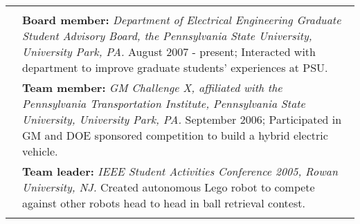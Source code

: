 \documentclass{article}[16pt]
\newlength{\lcolw}
\newlength{\rcolw}
\newlength{\hlcolw}
\begin{document}
\begin{tabular}{L{\hlcolw}  L{\rcolw}}
\vspace{0.1in} \\ 
& \textbf{Board member:} {\it Department of Electrical Engineering Graduate Student Advisory Board, the Pennsylvania State University, University Park, PA.} August 2007 - present; Interacted with department to improve graduate students' experiences at PSU.
\vspace{0.1in} \\ 
& \textbf{Team member:} {\it GM Challenge X, affiliated with the Pennsylvania Transportation Institute, Pennsylvania State University, University Park, PA.} September 2006; Participated in GM and DOE sponsored competition to build a hybrid electric vehicle.
\vspace{0.1in} \\ 
& \textbf{Team leader:} {\it IEEE Student Activities Conference 2005, Rowan University, NJ.} Created autonomous Lego robot to compete against other robots head to head in ball retrieval contest.
\vspace{0.1in} \\ 
\hline \\
\end{tabular}

\end{document}
